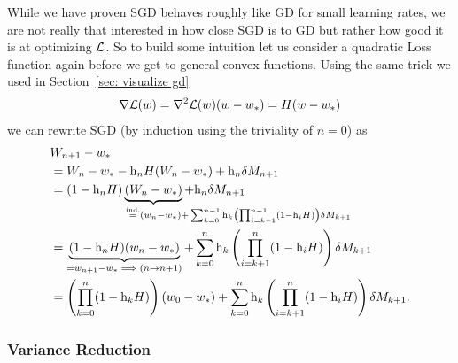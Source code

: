 While we have proven SGD behaves roughly like GD for small learning rates, we
are not really that interested in how close SGD is to GD but rather how good it
is at optimizing \(\mathcal{L}\). So to build some intuition let us consider a
quadratic Loss function again before we get to general convex functions.
Using the same trick we used in Section~\ref{sec: visualize gd} 
\begin{align*}
	\nabla\mathcal{L}(w)
	= \nabla^2\mathcal{L}(w)(w-w_*)
	= H(w-w_*)
\end{align*}
we can rewrite SGD (by induction using the triviality of \(n=0\)) as
\begin{align}
	\nonumber
	&\Weights_{n+1}-\weights_*\\
	\nonumber
	&= \Weights_n - \weights_* - \lr_n H(\Weights_n-\weights_*) + \lr_n\martIncr_{n+1}\\
	\nonumber
	&=(1-\lr_n H)\underbrace{(\Weights_n - \weights_*)}_{
		\xeq{\text{ind.}} (\weights_n - \weights_*)
		\mathrlap{+ \sum_{k=0}^{n-1}\lr_k\left(\prod_{i=k+1}^{n-1}(1-\lr_iH)\right)\martIncr_{k+1}}
	} + \lr_n\martIncr_{n+1}\\
	\nonumber
	&= \underbrace{(1-\lr_n H)(\weights_n - \weights_*)}_{=\weights_{n+1}-\weights_* \implies (n\to n+1)}
	+ \sum_{k=0}^n\lr_k\left(\prod_{i=k+1}^n(1-\lr_iH)\right)\martIncr_{k+1}\\
	\label{eq: unrolled SGD weights (general quadratic loss case)}
	&=\left(\prod_{k=0}^n(1-\lr_kH)\right)(\weights_0-\weights_*)
	+ \sum_{k=0}^n\lr_k\left(\prod_{i=k+1}^n(1-\lr_iH)\right)\martIncr_{k+1}.
\end{align}

\subsubsection{Variance Reduction}

